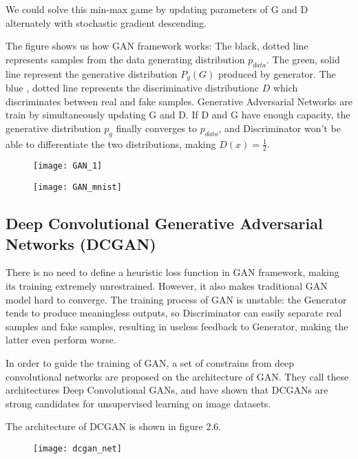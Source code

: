 We could solve this min-max game by updating parameters of G and D alternately with stochastic gradient descending.

The figure shows us how GAN framework works: The black, dotted line represents samples from the data generating distribution $p_{data}$. The green, solid line represent the generative distribution $P_g(G)$ produced by generator. The blue , dotted line represents the discriminative distributionc $D$ which discriminates between real and fake samples. Generative Adversarial Networks are train by simultaneously updating G and D. If D and G have enough capacity, the generative distribution $p_g$ finally converges to $p_{data}$, and Discriminator won't be able to differentiate the two distributions, making $D(x)=\frac{1}{2}$.
\begin{figure}
	\centering
	\texttt{[image: GAN\_1]}
	\label{fig:7}
\end{figure}

\begin{figure}
	\centering
	\texttt{[image: GAN\_mnist]}
	\label{fig:8}
\end{figure}
\subsection{Deep Convolutional Generative Adversarial Networks (DCGAN)\cite{radford2015unsupervised}}
There is no need to define a heuristic loss function in GAN framework, making its training extremely unrestrained. However, it also makes traditional GAN model hard to converge. The training process of GAN is unstable: the Generator tends to produce meaningless outputs, so Discriminator can easily separate real samples and fake samples, resulting in useless feedback to Generator, making the latter even perform worse.

In order to guide the training of GAN, a set of constrains from deep convolutional networks are proposed on the architecture of GAN. They call these architectures Deep Convolutional GANs, and have shown that DCGANs are strong candidates for unsupervised learning on image datasets.

The architecture of DCGAN is shown in figure 2.6.
\begin{figure}
	\centering
	\texttt{[image: dcgan\_net]}
	\label{fig:9}
\end{figure}

